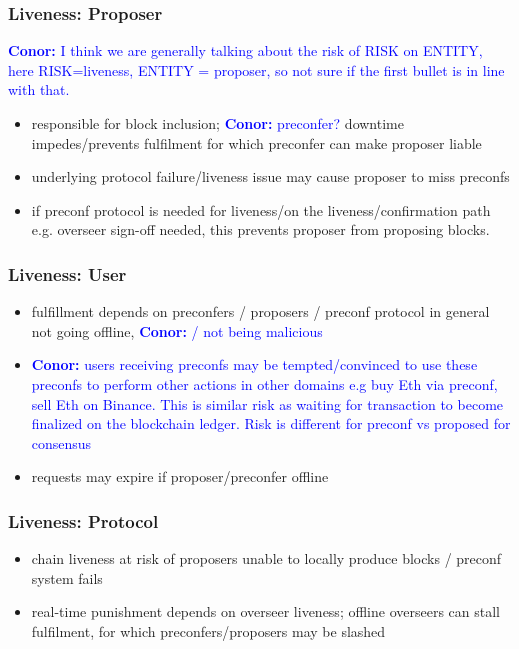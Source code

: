 \documentclass[a4paper]{article}
\theoremstyle{boldstyle}
\newcommand{\cm}[1]{\textcolor{blue}{\textbf{Conor:} #1}}
\begin{document}
    \subsubsection{Liveness: Proposer}
    \cm{I think we are generally talking about the risk of RISK on ENTITY, here RISK=liveness, ENTITY = proposer, so not sure if the first bullet is in line with that. }
        \begin{itemize}
            \item responsible for block inclusion; \cm{preconfer?} downtime impedes/prevents fulfilment for which preconfer can make proposer liable
            \item underlying protocol failure/liveness issue may cause proposer to miss preconfs
            \item if preconf protocol is needed for liveness/on the liveness/confirmation path e.g. overseer sign-off needed, this prevents proposer from proposing blocks.
        \end{itemize}
    
    \subsubsection{Liveness: User}
        \begin{itemize}
            \item fulfillment depends on preconfers / proposers / preconf protocol in general not going offline, \cm{ / not being malicious}
            \item \cm{users receiving preconfs may be tempted/convinced to use these preconfs to perform other actions in other domains e.g buy Eth via preconf, sell Eth on Binance. This is similar risk as waiting for transaction to become finalized on the blockchain ledger. Risk is different for preconf vs proposed for consensus}
            \item requests may expire if proposer/preconfer offline 
        \end{itemize}
    
    \subsubsection{Liveness: Protocol}
        \begin{itemize}
            \item chain liveness at risk of proposers unable to locally produce blocks / preconf system fails
            \item real-time punishment depends on overseer liveness; offline overseers can stall fulfilment, for which preconfers/proposers may be slashed
        \end{itemize}
\end{document}
